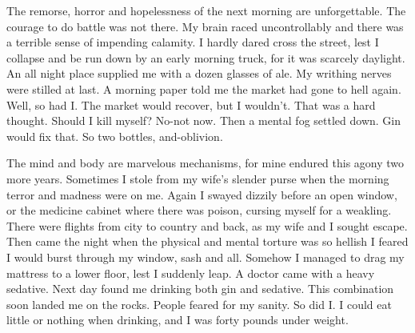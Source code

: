 \begin{biblechapter}
    The remorse, horror and hopelessness of the next morning are unforgettable.
\verse The courage to do battle was not there.
\verse My brain raced uncontrollably 
    and there was a terrible sense of impending calamity.
\verse I hardly dared cross the street, 
    lest I collapse and be run down by an early morning truck, 
    for it was scarcely daylight.
\verse An all night place supplied me with a dozen glasses of ale.
\verse My writhing nerves were stilled at last.
\verse A morning paper told me the market had gone to hell again.
\verse Well, so had I.
\verse The market would recover, but I wouldn't.
\verse That was a hard thought.
\verse Should I kill myself?
\verse No-not now.
\verse Then a mental fog settled down.
\verse Gin would fix that.
\verse So two bottles, and-oblivion.

\verse The mind and body are marvelous mechanisms, 
    for mine endured this agony two more years.
\verse Sometimes I stole from my wife's slender purse 
    when the morning terror and madness were on me.
\verse Again I swayed dizzily before an open window, 
    or the medicine cabinet where there was poison, 
    cursing myself for a weakling.
\verse There were flights from city to country and back, 
    as my wife and I sought escape.
\verse Then came the night when the physical and mental torture was so hellish 
    I feared I would burst through my window, sash and all.
\verse Somehow I managed to drag my mattress to a lower floor, lest I suddenly leap.
\verse A doctor came with a heavy sedative.
\verse Next day found me drinking both gin and sedative.
\verse This combination soon landed me on the rocks.
\verse People feared for my sanity.
\verse So did I.
\verse I could eat little or nothing when drinking, and I was forty pounds under weight.
\end{biblechapter}


